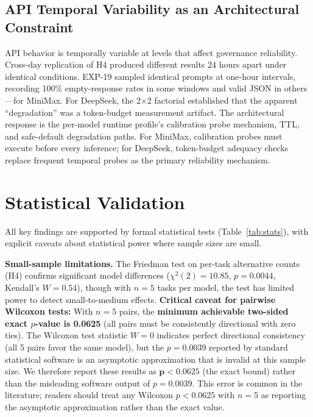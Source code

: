 \documentclass[11pt,a4paper]{article}
\begin{document}
\subsection{API Temporal Variability as an Architectural Constraint}

API behavior is temporally variable at levels that affect governance reliability. Cross-day replication of H4 produced different results 24 hours apart under identical conditions. EXP-19 sampled identical prompts at one-hour intervals, recording 100\% empty-response rates in some windows and valid JSON in others---for MiniMax. For DeepSeek, the 2$\times$2 factorial established that the apparent ``degradation'' was a token-budget measurement artifact. The architectural response is the per-model runtime profile's calibration probe mechanism, TTL, and safe-default degradation paths. For MiniMax, calibration probes must execute before every inference; for DeepSeek, token-budget adequacy checks replace frequent temporal probes as the primary reliability mechanism.

\section{Statistical Validation}

All key findings are supported by formal statistical tests (Table~\ref{tab:stats}), with explicit caveats about statistical power where sample sizes are small.

\textbf{Small-sample limitations.} The Friedman test on per-task alternative counts (H4) confirms significant model differences ($\chi^2(2)=10.85$, $p=0.0044$, Kendall's $W=0.54$), though with $n=5$ tasks per model, the test has limited power to detect small-to-medium effects. \textbf{Critical caveat for pairwise Wilcoxon tests:} With $n=5$ pairs, the \textbf{minimum achievable two-sided exact $p$-value is 0.0625} (all pairs must be consistently directional with zero ties). The Wilcoxon test statistic $W=0$ indicates perfect directional consistency (all 5 pairs favor the same model), but the $p=0.0039$ reported by standard statistical software is an asymptotic approximation that is invalid at this sample size. We therefore report these results as $\mathbf{p<0.0625}$ (the exact bound) rather than the misleading software output of $p=0.0039$. This error is common in the literature; readers should treat any Wilcoxon $p<0.0625$ with $n=5$ as reporting the asymptotic approximation rather than the exact value.
\end{document}
